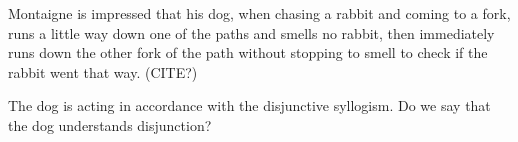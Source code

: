Montaigne is impressed that his dog, when chasing
a rabbit and coming to a fork, runs a little way
down one of the paths and smells no rabbit, then
immediately runs down the other fork of the path
without stopping to smell to check if the rabbit
went that way. (CITE?)

The dog is acting in accordance with the
disjunctive syllogism. Do we say that the dog
understands disjunction?